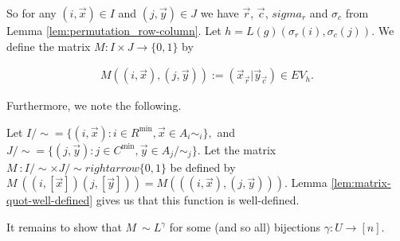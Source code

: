\documentclass[../paper.tex]{subfiles}
\begin{document}
So for any $(i, \vec{x}) \in I$ and $(j, \vec{y}) \in J$ we have $\vec{r}$,
$\vec{c}$, $sigma_r$ and $\sigma_c$ from Lemma \ref{lem:permutation_row-column}.
Let $h = L(g)(\sigma_r(i), \sigma_c (j))$. We define the matrix $M : I \times J
\rightarrow \{0,1\}$ by

\begin{align*}
  M((i , \vec{x}), (j, \vec{y})) := (\vec{x}_{\vec{r}} \vert \vec{y}_{\vec{c}}) \in EV_h.
\end{align*}

Furthermore, we note the following.



Let $I /{\sim} = \{(i, \vec{x}): i \in R^{\min}, \vec{x} \in A_i{\sim_i}\},$ and
$J/{\sim} = \{(j, \vec{y}): j \in C^{\min}, \vec{y} \in A_j/{\sim_j}\}$. Let the
matrix $M_{~} : I /{\sim} \times J / {\sim} rightarrow \{0,1\}$ be defined by
$M_{~} ((i, [\vec{x}]) (j, [\vec{y}])) = M(((i, \vec{x}), (j, \vec{y})))$. Lemma
\ref{lem:matrix-quot-well-defined} gives us that this function is well-defined.

It remains to show that $M_{~} \sim L^{\gamma}$ for some (and so all) bijections
$\gamma: U \rightarrow [n]$.


\end{document}
